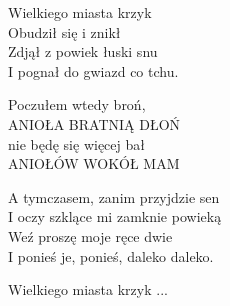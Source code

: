 \begin{text}
    Wielkiego miasta krzyk\\
    Obudził się i znikł\\
    Zdjął z powiek łuski snu\\
    I pognał do gwiazd co tchu.

    Poczułem wtedy broń,\\
    ANIOŁA BRATNIĄ DŁOŃ\\
    nie będę się więcej bał\\
    ANIOŁÓW WOKÓŁ MAM

    A tymczasem, zanim przyjdzie sen\\
    I oczy szklące mi zamknie powieką\\
    Weź proszę moje ręce dwie\\
    I ponieś je, ponieś, daleko daleko.

    Wielkiego miasta krzyk ...
\end{text}
\begin{chord}

\end{chord}